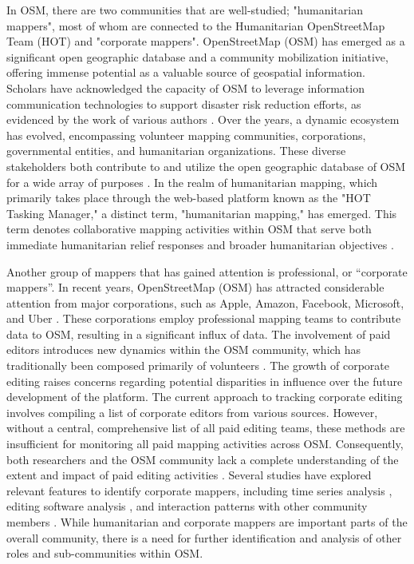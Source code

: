 \documentclass[manuscript,screen,review]{acmart}
\begin{document}
In OSM, there are two communities that are well-studied;  "humanitarian mappers", most of whom are connected to the Humanitarian OpenStreetMap Team (HOT) \cite{soden2014crowdsourced} and "corporate mappers". OpenStreetMap (OSM) has emerged as a significant open geographic database and a community mobilization initiative, offering immense potential as a valuable source of geospatial information. Scholars have acknowledged the capacity of OSM to leverage information communication technologies to support disaster risk reduction efforts, as evidenced by the work of various authors \cite{Neis12, scholz18, Aitsi-Selmi16}. Over the years, a dynamic ecosystem has evolved, encompassing volunteer mapping communities, corporations, governmental entities, and humanitarian organizations. These diverse stakeholders both contribute to and utilize the open geographic database of OSM for a wide array of purposes \cite{herfort2021evolution}. In the realm of humanitarian mapping, which primarily takes place through the web-based platform known as the "HOT Tasking Manager," a distinct term, "humanitarian mapping," has emerged. This term denotes collaborative mapping activities within OSM that serve both immediate humanitarian relief responses and broader humanitarian objectives \cite{albuquerque16,dittus16,palen15, soden2014crowdsourced}.

Another group of mappers that has gained attention is professional, or “corporate mappers”. In recent years, OpenStreetMap (OSM) has attracted considerable attention from major corporations, such as Apple, Amazon, Facebook, Microsoft, and Uber \cite{anderson20, Anderson19, sarkar21}. These corporations employ professional mapping teams to contribute data to OSM, resulting in a significant influx of data. The involvement of paid editors introduces new dynamics within the OSM community, which has traditionally been composed primarily of volunteers \cite{Veselovsky22}. The growth of corporate editing raises concerns regarding potential disparities in influence over the future development of the platform. The current approach to tracking corporate editing involves compiling a list of corporate editors from various sources\cite{Anderson19}. However, without a central, comprehensive list of all paid editing teams, these methods are insufficient for monitoring all paid mapping activities across OSM. Consequently, both researchers and the OSM community lack a complete understanding of the extent and impact of paid editing activities \cite{Veselovsky22}. Several studies have explored relevant features to identify corporate mappers, including time series analysis \cite{Yasseri12, Veselovsky22}, editing software analysis \cite{jacobs20}, and interaction patterns with other community members \cite{Mooney12}. While humanitarian and corporate mappers are important parts of the overall community, there is a need for further identification and analysis of other roles and sub-communities within OSM.
\end{document}
